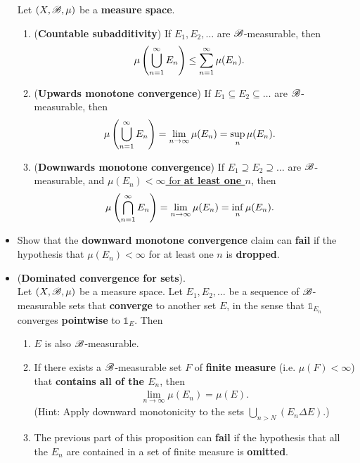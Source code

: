 \documentclass[11pt]{article}
\begin{document}
\begin{itemize}
\begin{proposition} 
Let $(X, {\mathscr B}, \mu)$ be a \textbf{measure space}.
\begin{enumerate}
\item (\textbf{Countable subadditivity}) If $E_1, E_2, \ldots $ are ${\mathscr B}$-measurable, then 
\begin{align*}
\mu\left(\bigcup_{n=1}^{\infty} E_n\right) &\le \sum_{n=1}^{\infty} \mu(E_n).
\end{align*}
\item (\textbf{Upwards monotone convergence}) If $E_1 \subseteq E_2 \subseteq \ldots$ are ${\mathscr B}$-measurable, then
\begin{align}
\mu\left(\bigcup_{n=1}^{\infty} E_n\right) &= \lim\limits_{n\rightarrow \infty}\mu(E_n) = \sup\limits_{n}\mu(E_n). \label{eqn: countable_additive_measure_upward_monotone_convergence}
\end{align}
\item (\textbf{Downwards monotone convergence}) If $E_1 \supseteq E_2 \supseteq \ldots$ are ${\mathscr B}$-measurable, and \underline{$\mu(E_n) < \infty$ for \textbf{at least one $n$}}, then
\begin{align}
\mu\left(\bigcap_{n=1}^{\infty} E_n\right) &= \lim\limits_{n\rightarrow \infty}\mu(E_n) = \inf\limits_{n}\mu(E_n). \label{eqn: countable_additive_measure_downward_monotone_convergence}
\end{align}
\end{enumerate}
\end{proposition}

\item \begin{exercise}
Show that the \textbf{downward monotone convergence} claim can \textbf{fail} if the hypothesis that $\mu(E_n) < \infty$ for at least one $n$ is \textbf{dropped}. 
\end{exercise}

\item \begin{proposition} (\textbf{Dominated convergence for sets}). \citep{tao2011introduction} \\
Let $(X, {\mathscr B}, \mu)$ be a measure space. Let $E_1, E_2, \ldots $ be a sequence of ${\mathscr B}$-measurable sets that \textbf{converge} to another set $E$, in the sense that $\mathds{1}_{E_n}$ converges \textbf{pointwise} to $\mathds{1}_{E}$. Then 
\begin{enumerate}
\item $E$ is also ${\mathscr B}$-measurable.
\item If there exists a ${\mathscr B}$-measurable set $F$ of \textbf{finite measure} (i.e. $\mu(F) < \infty$) that \textbf{contains all of the $E_n$}, then
\begin{align*}
\lim\limits_{n \rightarrow \infty} \mu(E_n) = \mu(E). 
\end{align*}
(Hint: Apply downward monotonicity to the sets $\bigcup_{n>N}(E_n \Delta E)$.)
\item The previous part of this proposition can \textbf{fail} if the hypothesis that all the $E_n$ are contained in a set of finite measure is \textbf{omitted}.
\end{enumerate}
\end{proposition}


\end{itemize}
\end{document}
